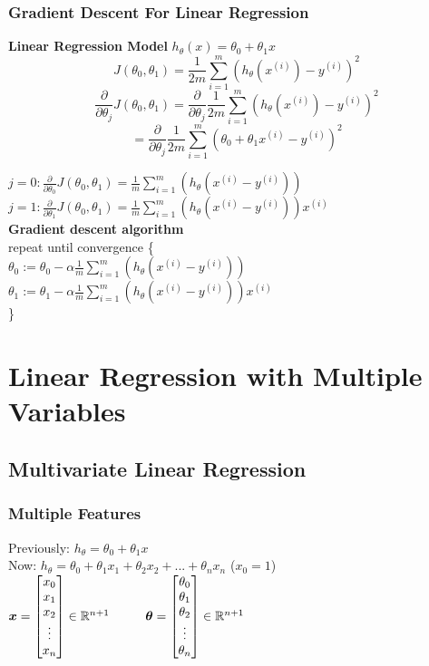 \documentclass{article}
\newcommand\tab[1][1cm]{\hspace*{#1}}
\newcommand{\vect}[1]{\boldsymbol{#1}}
\begin{document}
\subsubsection{Gradient Descent For Linear Regression}
\textbf{Linear Regression Model}
$h_\theta(x) = \theta_0 + \theta_1 x$
$$J(\theta_0, \theta_1) = \frac{1}{2m} \sum_{i=1}^{m}(h_\theta(x^{(i)}) - y^{(i)})^2$$
$$\frac{\partial}{\partial \theta_j}J(\theta_0, \theta_1) = \frac{\partial}{\partial \theta_j} \frac{1}{2m} \sum_{i=1}^{m}(h_\theta(x^{(i)}) - y^{(i)})^2$$
$$ = \frac{\partial}{\partial \theta_j} \frac{1}{2m} \sum_{i=1}^{m}(\theta_0 + \theta_1 x^{(i)} - y^{(i)})^2$$

$j = 0: \frac{\partial}{\partial \theta_0}J(\theta_0, \theta_1) = \frac{1}{m} \sum_{i=1}^{m}(h_\theta(x^{(i)} - y^{(i)}))$\\
$j = 1: \frac{\partial}{\partial \theta_1}J(\theta_0, \theta_1) = \frac{1}{m} \sum_{i=1}^{m}(h_\theta(x^{(i)} - y^{(i)})) x^{(i)}$\\

\textbf{Gradient descent algorithm}\\
repeat until convergence \{\\
\tab $\theta_0 := \theta_0 - \alpha \frac{1}{m} \sum_{i=1}^{m}(h_\theta(x^{(i)} - y^{(i)})) $ \\
\tab $\theta_1 := \theta_1 - \alpha \frac{1}{m} \sum_{i=1}^{m}(h_\theta(x^{(i)} - y^{(i)})) x^{(i)} $ \\
\}\\

\newpage

\section{Linear Regression with Multiple Variables}
\subsection{Multivariate Linear Regression}
\subsubsection{Multiple Features}
Previously: $h_\theta = \theta_0 + \theta_1 x$ \\
Now: $h_\theta = \theta_0 + \theta_1 x_1 + \theta_2 x_2 + ... + \theta_n x_n$ ($x_0 = 1$) \\

$\vect{x} = \begin{bmatrix}
x_0 \\ x_1 \\ x_2 \\ \vdots \\ x_n 
\end{bmatrix} \in \mathbb{R}^{n+1}
\tab
\vect{\theta} = \begin{bmatrix}
\theta_0 \\ \theta_1 \\ \theta_2 \\ \vdots \\ \theta_n 
\end{bmatrix} \in \mathbb{R}^{n+1} \\\\
\tab$
\end{document}
